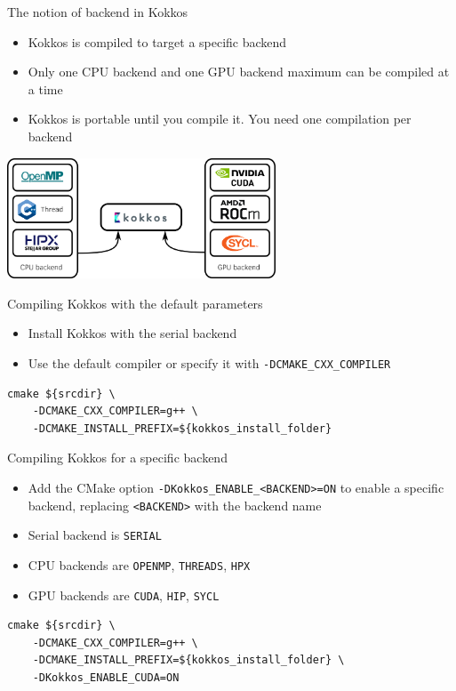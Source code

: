 \documentclass[aspectratio=169]{beamer}
\begin{document}
\begin{frame}{The notion of backend in Kokkos}
    \begin{itemize}
        \item Kokkos is compiled to target a specific backend
        \item Only one CPU backend and one GPU backend maximum can be compiled at a time
        \item Kokkos is portable until you compile it. You need one compilation per backend
    \end{itemize}
    \begin{center}
        \includegraphics[width=0.6\textwidth]{kokkos_backend.png}
    \end{center}
\end{frame}


\begin{frame}[fragile]{Compiling Kokkos with the default parameters}
    \begin{itemize}
        \item Install Kokkos with the serial backend
        \item Use the default compiler or specify it with \texttt{-DCMAKE\_CXX\_COMPILER}
    \end{itemize}
    \begin{verbatim}
cmake ${srcdir} \
    -DCMAKE_CXX_COMPILER=g++ \
    -DCMAKE_INSTALL_PREFIX=${kokkos_install_folder}
    \end{verbatim}
\end{frame}


\begin{frame}[fragile]{Compiling Kokkos for a specific backend}
    \begin{itemize}
        \item Add the CMake option \texttt{-DKokkos\_ENABLE\_<BACKEND>=ON} to enable a specific backend, replacing \texttt{<BACKEND>} with the backend name
        \item Serial backend is \texttt{SERIAL}
        \item CPU backends are \texttt{OPENMP}, \texttt{THREADS}, \texttt{HPX}
        \item GPU backends are \texttt{CUDA}, \texttt{HIP}, \texttt{SYCL}
    \end{itemize}
    \begin{verbatim}
cmake ${srcdir} \
    -DCMAKE_CXX_COMPILER=g++ \
    -DCMAKE_INSTALL_PREFIX=${kokkos_install_folder} \
    -DKokkos_ENABLE_CUDA=ON
    \end{verbatim}
\end{frame}
\end{document}
